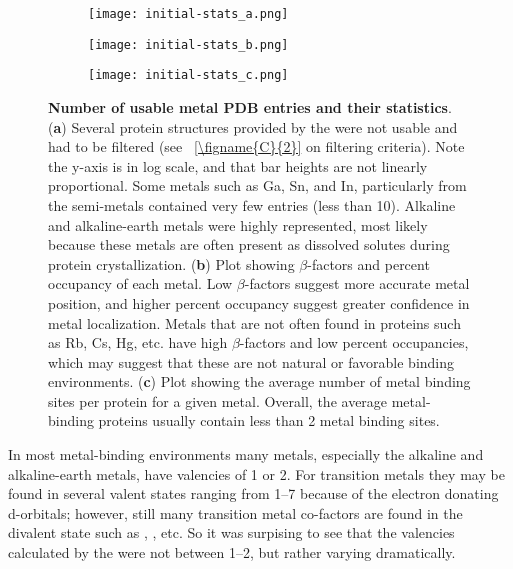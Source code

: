\documentclass[../main/main]{subfiles}
\begin{document}
\begin{figure}[H]
	\begin{subfigure}{\columnwidth}
		\centering
		\texttt{[image: initial-stats\_a.png]}
	\end{subfigure}
\end{figure}
%
\begin{figure}[H]\ContinuedFloat
	\begin{subfigure}{\columnwidth}
		\centering
		\texttt{[image: initial-stats\_b.png]}
	\end{subfigure}
\end{figure}
%
\begin{figure}[H]\ContinuedFloat
	\begin{subfigure}{\columnwidth}
		\centering
		\texttt{[image: initial-stats\_c.png]}
	\end{subfigure}
%
	\caption[Number of usable metal PDB entries and their statistics]
	{
		\textbf{Number of usable metal PDB entries and their statistics}.
		(\textbf{a}) Several protein structures provided by the \mPDB{} were not usable and had to be filtered (see \FIGURE~\ref{\figname{C}{2}} on filtering criteria). Note the y-axis is in log scale, and that bar heights are not linearly proportional. Some metals such as Ga, Sn, and In, particularly from the semi-metals contained very few entries (less than 10). Alkaline and alkaline-earth metals were highly represented, most likely because these metals are often present as dissolved solutes during protein crystallization.
		(\textbf{b}) Plot showing $\beta$-factors and percent occupancy of each metal. Low $\beta$-factors suggest more accurate metal position, and higher percent occupancy suggest greater confidence in metal localization. Metals that are not often found in proteins such as Rb, Cs, Hg, etc. have high $\beta$-factors and low percent occupancies, which may suggest that these are not natural or favorable binding environments.
		(\textbf{c}) Plot showing the average number of metal binding sites per protein for a given metal. Overall, the average metal-binding proteins usually contain less than 2 metal binding sites.
	}
	\label{\figname{C}{4}}
\end{figure}

In most metal-binding environments many metals, especially the alkaline and alkaline-earth metals, have valencies of 1 or 2. For transition metals they may be found in several valent states ranging from 1--7 because of the electron donating d-orbitals; however, still many transition metal co-factors are found in the divalent state such as , ,   etc. So it was surpising to see that the valencies calculated by the \mPDB{} were not between 1--2, but rather varying dramatically.
\end{document}
